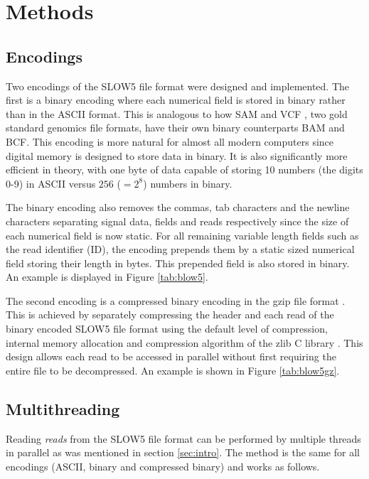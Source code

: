 \section{Methods}
\label{sec:methods}

\subsection{Encodings}
\label{sec:methods:encode}

Two encodings of the SLOW5 file format were designed and implemented. The first is a binary encoding where each numerical field is stored in binary rather than in the ASCII format. This is analogous to how SAM \cite{sam:file, sam:stats} and VCF \cite{vcf:file}, two gold standard genomics file formats, have their own binary counterparts BAM and BCF. This encoding is more natural for almost all modern computers since digital memory is designed to store data in binary. It is also significantly more efficient in theory, with one byte of data capable of storing 10 numbers (the digits 0-9) in ASCII versus $256$ ($ = 2^8$) numbers in binary.

The binary encoding also removes the commas, tab characters and the newline characters separating signal data, fields and reads respectively since the size of each numerical field is now static. For all remaining variable length fields such as the read identifier (ID), the encoding prepends them by a static sized numerical field storing their length in bytes. This prepended field is also stored in binary. An example is displayed in Figure \ref{tab:blow5}.

The second encoding is a compressed binary encoding in the gzip file format \cite{gzip}. This is achieved by separately compressing the header and each read of the binary encoded SLOW5 file format using the default level of compression, internal memory allocation and compression algorithm of the zlib C library \cite{zlib}. This design allows each read to be accessed in parallel without first requiring the entire file to be decompressed. An example is shown in Figure \ref{tab:blow5gz}.

\subsection{Multithreading}
\label{sec:methods:multi}

Reading \textit{reads} from the SLOW5 file format can be performed by multiple threads in parallel as was mentioned in section \ref{sec:intro}. The method is the same for all encodings (ASCII, binary and compressed binary) and works as follows.

